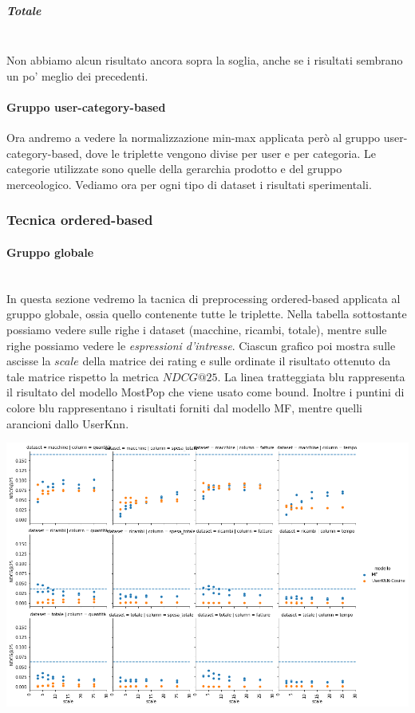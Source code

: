 \subparagraph{Totale}\mbox{} \\
Non abbiamo alcun risultato ancora sopra la soglia, anche se i risultati sembrano un po' meglio dei precedenti.

\paragraph{Gruppo user-category-based}
Ora andremo a vedere la normalizzazione min-max applicata però al gruppo user-category-based, dove le triplette vengono divise per user e per categoria.
Le categorie utilizzate sono quelle della gerarchia prodotto e del gruppo merceologico. Vediamo ora per ogni tipo di dataset i risultati sperimentali.


\subsubsection{Tecnica ordered-based}

\paragraph{Gruppo globale}\mbox{} \\
In questa sezione vedremo la tacnica di preprocessing ordered-based applicata al gruppo globale, ossia quello contenente tutte le triplette.
Nella tabella sottostante possiamo vedere sulle righe i dataset (macchine, ricambi, totale), mentre sulle righe possiamo vedere le \textit{espressioni d'intresse}. Ciascun grafico poi mostra sulle ascisse la $scale$ della matrice dei rating e sulle ordinate il risultato ottenuto da tale matrice rispetto la metrica $NDCG@25$. La linea tratteggiata blu rappresenta il risultato del modello MostPop che viene usato come bound.
Inoltre i puntini di colore blu rappresentano i risultati forniti dal modello MF, mentre quelli arancioni dallo UserKnn.

\includegraphics[width=16cm]{figures/risultati_ordered_globale.png}

